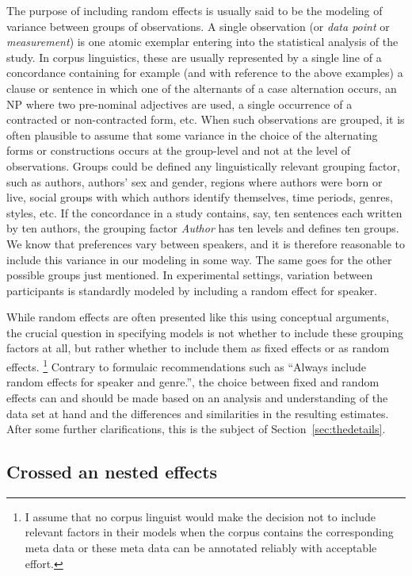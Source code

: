 \documentclass[a4paper,12pt]{article}
\begin{document}
The purpose of including random effects is usually said to be the modeling of variance between groups of observations.
A single observation (or \textit{data point} or \textit{measurement}) is one atomic exemplar entering into the statistical analysis of the study.
In corpus linguistics, these are usually represented by a single line of a concordance containing for example (and with reference to the above examples) a clause or sentence in which one of the alternants of a case alternation occurs, an NP where two pre-nominal adjectives are used, a single occurrence of a contracted or non-contracted form, etc.
When such observations are grouped, it is often plausible to assume that some variance in the choice of the alternating forms or constructions occurs at the group-level and not at the level of observations.
Groups could be defined any linguistically relevant grouping factor, such as authors, authors' sex and gender, regions where authors were born or live, social groups with which authors identify themselves, time periods, genres, styles, etc.
If the concordance in a study contains, say, ten sentences each written by ten authors, the grouping factor \textit{Author} has ten levels and defines ten groups.
We know that preferences vary between speakers, and it is therefore reasonable to include this variance in our modeling in some way.
The same goes for the other possible groups just mentioned.
In experimental settings, variation between participants is standardly modeled by including a random effect for speaker.

While random effects are often presented like this using conceptual arguments, the crucial question in specifying models is not whether to include these grouping factors at all, but rather whether to include them as fixed effects or as random effects.%
\footnote{I assume that no corpus linguist would make the decision not to include relevant factors in their models when the corpus contains the corresponding meta data or these meta data can be annotated reliably with acceptable effort.}
Contrary to formulaic recommendations such as ``Always include random effects for speaker and genre.'', the choice between fixed and random effects can and should be made based on an analysis and understanding of the data set at hand and the differences and similarities in the resulting estimates.
After some further clarifications, this is the subject of Section~\ref{sec:thedetails}.

\subsection{Crossed an nested effects}
\label{sec:crossedandnestedeffects}
\end{document}
